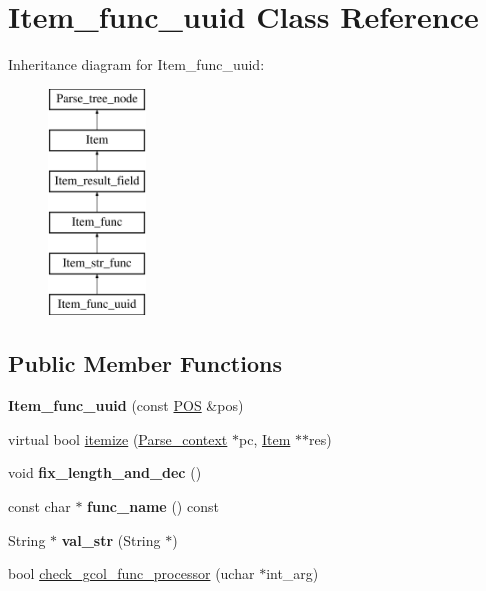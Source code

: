 \hypertarget{classItem__func__uuid}{}\section{Item\+\_\+func\+\_\+uuid Class Reference}
\label{classItem__func__uuid}
Inheritance diagram for Item\+\_\+func\+\_\+uuid\+:\begin{figure}[H]
\begin{center}
\leavevmode
\includegraphics[height=6.000000cm]{classItem__func__uuid}
\end{center}
\end{figure}
\subsection*{Public Member Functions}
\begin{DoxyCompactItemize}
\item 
\mbox{\label{classItem__func__uuid_a26afcb9666c3233aa30ebd0bbb2388f2}} 
{\bfseries Item\+\_\+func\+\_\+uuid} (const \mbox{\hyperlink{structYYLTYPE}{P\+OS}} \&pos)
\item 
virtual bool \mbox{\hyperlink{classItem__func__uuid_a004c316cb6e1c0620b1b13d49f5571f7}{itemize}} (\mbox{\hyperlink{structParse__context}{Parse\+\_\+context}} $\ast$pc, \mbox{\hyperlink{classItem}{Item}} $\ast$$\ast$res)
\item 
\mbox{\label{classItem__func__uuid_ad339772fe685a02cbefd1f0d7bdbc3a3}} 
void {\bfseries fix\+\_\+length\+\_\+and\+\_\+dec} ()
\item 
\mbox{\label{classItem__func__uuid_ae8604ebdc6702a8023ad278fc65dc2fc}} 
const char $\ast$ {\bfseries func\+\_\+name} () const
\item 
\mbox{\label{classItem__func__uuid_aeb9bd143dd6fd89fd2e3dba379b18b8b}} 
String $\ast$ {\bfseries val\+\_\+str} (String $\ast$)
\item 
bool \mbox{\hyperlink{classItem__func__uuid_a2ffae007bf0712dd82926ee1a994dc70}{check\+\_\+gcol\+\_\+func\+\_\+processor}} (uchar $\ast$int\+\_\+arg)
\end{DoxyCompactItemize}
